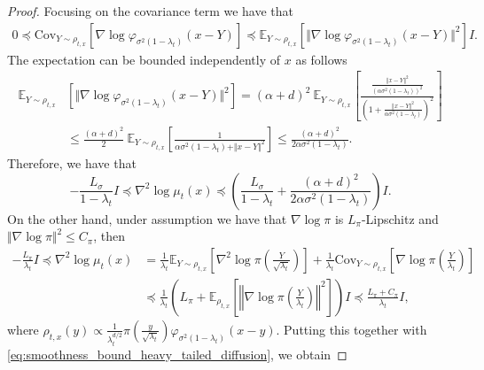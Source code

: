 \begin{proof}
Focusing on the covariance term we have that
\begin{align*}
   0\preccurlyeq \text{Cov}_{Y\sim \rho_{t, x}} [\nabla \log\varphi_{\sigma^2(1-\lambda_t)}(x- Y)] \preccurlyeq \mathbb{E}_{Y\sim \rho_{t, x}}\left[ \Vert \nabla \log\varphi_{\sigma^2 (1-\lambda_t)}(x- Y)\Vert^2 \right] I.
\end{align*}
The expectation can be bounded independently of $x$ as follows
\begin{align}
    \mathbb{E}_{Y\sim \rho_{t, x}}&\left[ \Vert \nabla \log\varphi_{\sigma^2 (1-\lambda_t)}(x- Y)\Vert^2 \right] =  (\alpha +d)^2 \ \mathbb{E}_{Y\sim \rho_{t, x}}\left[  \frac{\frac{\left \Vert x- Y\right\Vert^2}{(\alpha\sigma^2(1-\lambda_t))^2}}{\left(1 + \frac{\Vert x - Y\Vert^2}{\alpha\sigma^2(1-\lambda_t)}\right)^2} \right]\nonumber \\
    &\leq \frac{(\alpha +d)^2}{2}\ \mathbb{E}_{Y\sim \rho_{t, x}}\left[  \frac{1}{\alpha\sigma^2(1-\lambda_t) + \Vert x - Y\Vert^2} \right] \leq \frac{(\alpha + d)^2}{2\alpha\sigma^2(1-\lambda_t)}.\label{eq:auxiliary_condition_heavy_tailed_distribution}
\end{align}
Therefore, we have that 
\begin{equation}\label{eq:smoothness_bound_heavy_tailed_diffusion}
    -\frac{L_\sigma}{1-\lambda_t} I \preccurlyeq \nabla^2\log\mu_t(x) \preccurlyeq \left(\frac{L_\sigma}{1-\lambda_t}+ \frac{(\alpha + d)^2}{2\alpha\sigma^2(1-\lambda_t)}\right) I.
\end{equation}
On the other hand, under assumption  we have that $\nabla\log\pi$ is $L_\pi$-Lipschitz and $\Vert\nabla \log \pi \Vert^2\leq C_\pi$, then 
\begin{align*}
    -\frac{L_\pi}{\lambda_t} I\preccurlyeq \nabla^2\log\mu_t(x) &= \frac{1}{\lambda_t} \mathbb{E}_{Y\sim {\rho}_{t, x}} \left[\nabla^2 \log \pi\left(\frac{Y}{\sqrt{\lambda_t}}\right)\right] + \frac{1}{\lambda_t}\text{Cov}_{Y\sim {\rho}_{t, x}} \left[\nabla \log\pi\left(\frac{Y}{\lambda_t}\right)\right]\\
    &\preccurlyeq  \frac{1}{\lambda_t}\left({L_\pi}+\mathbb{E}_{\rho_{t,x}}\left[ \left\Vert\nabla\log\pi\left(\frac{Y}{\lambda_t}\right)\right\Vert^2\right]\right) I \preccurlyeq \frac{L_\pi+ C_\pi}{\lambda_t} I,
\end{align*}
where $\rho_{t, x} (y) \propto \frac{1}{\lambda_t^{d/2}} \pi\left(\frac{y}{\sqrt{\lambda_t}}\right) \varphi_{\sigma^2(1-\lambda_t)}(x-y)$. Putting this together with \eqref{eq:smoothness_bound_heavy_tailed_diffusion}, we obtain

\end{proof}
